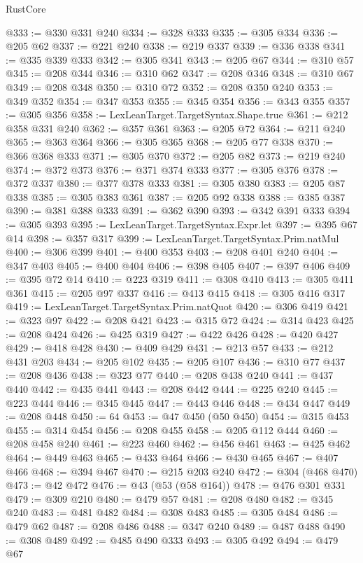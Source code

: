 \begin{lexlean}{RustCore}
\begin{coremodule}
@333 := @330 @331 @240
@334 := @328 @333
@335 := @305 @334
@336 := @205 @62
@337 := @221 @240
@338 := @219 @337
@339 := @336 @338
@341 := @335 @339 @333
@342 := @305 @341
@343 := @205 @67
@344 := @310 @57
@345 := @208 @344
@346 := @310 @62
@347 := @208 @346
@348 := @310 @67
@349 := @208 @348
@350 := @310 @72
@352 := @208 @350 @240
@353 := @349 @352
@354 := @347 @353
@355 := @345 @354
@356 := @343 @355
@357 := @305 @356
@358 := LexLeanTarget.TargetSyntax.Shape.true
@361 := @212 @358 @331 @240
@362 := @357 @361
@363 := @205 @72
@364 := @211 @240
@365 := @363 @364
@366 := @305 @365
@368 := @205 @77 @338
@370 := @366 @368 @333
@371 := @305 @370
@372 := @205 @82
@373 := @219 @240
@374 := @372 @373
@376 := @371 @374 @333
@377 := @305 @376
@378 := @372 @337
@380 := @377 @378 @333
@381 := @305 @380
@383 := @205 @87 @338
@385 := @305 @383 @361
@387 := @205 @92 @338
@388 := @385 @387
@390 := @381 @388 @333
@391 := @362 @390
@393 := @342 @391 @333
@394 := @305 @393
@395 := LexLeanTarget.TargetSyntax.Expr.let
@397 := @395 @67 @14
@398 := @357 @317
@399 := LexLeanTarget.TargetSyntax.Prim.natMul
@400 := @306 @399
@401 := @400 @353
@403 := @208 @401 @240
@404 := @347 @403
@405 := @400 @404
@406 := @398 @405
@407 := @397 @406
@409 := @395 @72 @14
@410 := @223 @319
@411 := @308 @410
@413 := @305 @411 @361
@415 := @205 @97 @337
@416 := @413 @415
@418 := @305 @416 @317
@419 := LexLeanTarget.TargetSyntax.Prim.natQuot
@420 := @306 @419
@421 := @323 @97
@422 := @208 @421
@423 := @315 @72
@424 := @314 @423
@425 := @208 @424
@426 := @425 @319
@427 := @422 @426
@428 := @420 @427
@429 := @418 @428
@430 := @409 @429
@431 := @213 @57
@433 := @212 @431 @203
@434 := @205 @102
@435 := @205 @107
@436 := @310 @77
@437 := @208 @436
@438 := @323 @77
@440 := @208 @438 @240
@441 := @437 @440
@442 := @435 @441
@443 := @208 @442
@444 := @225 @240
@445 := @223 @444
@446 := @345 @445
@447 := @443 @446
@448 := @434 @447
@449 := @208 @448
@450 := 64
@453 := @47 @450 (@50 @450)
@454 := @315 @453
@455 := @314 @454
@456 := @208 @455
@458 := @205 @112 @444
@460 := @208 @458 @240
@461 := @223 @460
@462 := @456 @461
@463 := @425 @462
@464 := @449 @463
@465 := @433 @464
@466 := @430 @465
@467 := @407 @466
@468 := @394 @467
@470 := @215 @203 @240
@472 := @304 (@468 @470)
@473 := @42 @472
@476 := @43 (@53 (@58 @164))
@478 := @476 @301 @331
@479 := @309 @210
@480 := @479 @57
@481 := @208 @480
@482 := @345 @240
@483 := @481 @482
@484 := @308 @483
@485 := @305 @484
@486 := @479 @62
@487 := @208 @486
@488 := @347 @240
@489 := @487 @488
@490 := @308 @489
@492 := @485 @490 @333
@493 := @305 @492
@494 := @479 @67

\end{coremodule}
\end{lexlean}
